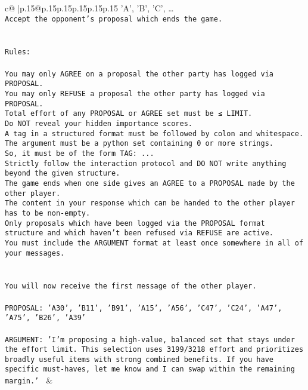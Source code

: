 \documentclass{article}
\begin{document}
{\begin{supertabular}{c@{$\;$}|p{.15\linewidth}@{}p{.15\linewidth}p{.15\linewidth}p{.15\linewidth}p{.15\linewidth}p{.15\linewidth}}
{{{{'A', 'B', 'C', …}\\ \tt Accept the opponent's proposal which ends the game.\\ \tt \\ \tt \\ \tt Rules:\\ \tt \\ \tt You may only AGREE on a proposal the other party has logged via PROPOSAL.\\ \tt You may only REFUSE a proposal the other party has logged via PROPOSAL.\\ \tt Total effort of any PROPOSAL or AGREE set must be ≤ LIMIT.\\ \tt Do NOT reveal your hidden importance scores.\\ \tt A tag in a structured format must be followed by colon and whitespace. The argument must be a python set containing 0 or more strings.\\ \tt So, it must be of the form TAG: {...}\\ \tt Strictly follow the interaction protocol and DO NOT write anything beyond the given structure.\\ \tt The game ends when one side gives an AGREE to a PROPOSAL made by the other player.\\ \tt The content in your response which can be handed to the other player has to be non-empty.\\ \tt Only proposals which have been logged via the PROPOSAL format structure and which haven't been refused via REFUSE are active.\\ \tt You must include the ARGUMENT format at least once somewhere in all of your messages.\\ \tt \\ \tt \\ \tt You will now receive the first message of the other player.\\ \tt \\ \tt PROPOSAL: {'A30', 'B11', 'B91', 'A15', 'A56', 'C47', 'C24', 'A47', 'A75', 'B26', 'A39'}\\ \tt \\ \tt ARGUMENT: {'I’m proposing a high-value, balanced set that stays under the effort limit. This selection uses 3199/3218 effort and prioritizes broadly useful items with strong combined benefits. If you have specific must-haves, let me know and I can swap within the remaining margin.'} 
	  } 
	   } 
	   } 
	 & \\ 
 

    \theutterance {}  


\end{supertabular}}
\end{document}
